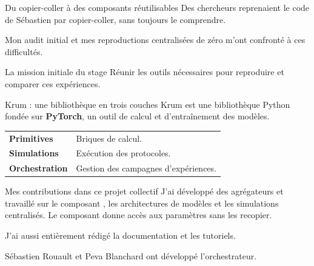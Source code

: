 \begin{frame}{Du copier-coller à des composants réutilisables}
    Des chercheurs reprenaient le code de Sébastien par copier-coller, sans
    toujours le comprendre.

    Mon audit initial et mes reproductions centralisées de zéro m'ont confronté
    à ces difficultés.

    \begin{block}{La mission initiale du stage}
        Réunir les outils nécessaires pour reproduire et comparer ces expériences.
    \end{block}
\end{frame}

\begin{frame}{Krum : une bibliothèque en trois couches}
    Krum est une bibliothèque Python fondée sur \textbf{PyTorch}, un outil
    de calcul et d'entraînement des modèles.

    \begin{tabular}{@{}ll@{}}
        \textbf{Primitives} & Briques de calcul.\\[0.3em]
        \textbf{Simulations} & Exécution des protocoles.\\[0.3em]
        \textbf{Orchestration} & Gestion des campagnes d'expériences.
    \end{tabular}

    \begin{block}{Mes contributions dans ce projet collectif}
        J'ai développé des agrégateurs et travaillé sur le composant ,
        les architectures de modèles et les simulations centralisés. Le composant 
        donne accès aux paramètres sans les recopier.

        J'ai aussi entièrement rédigé la documentation et les tutoriels.
    \end{block}

    \medskip
    Sébastien Rouault et Peva Blanchard ont développé l'orchestrateur.
\end{frame}
